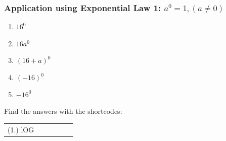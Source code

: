             \subsubsection{  Application using Exponential Law 1: ${a}^{0}=1,\left(a\ne 0\right)$ }
            \nopagebreak
        \label{m38359*id63666}\begin{enumerate}[noitemsep, label=\textbf{\arabic*}. ] 
            \label{m38359*uid6}\item 
            \begin{math}{16}^{0}\end{math}
      \label{m38359*uid7}\item 
        \begin{math}16{a}^{0}\end{math}
      \label{m38359*uid8}\item 
        \begin{math}{\left(16+a\right)}^{0}\end{math}
      \label{m38359*uid9}\item 
        \begin{math}{\left(-16\right)}^{0}\end{math}
      \label{m38359*uid10}\item 
        \begin{math}-{16}^{0}\end{math} 
\newline
\newline
          \end{enumerate}
      \label{m38359*uid11}
\par {} Find the answers with the shortcodes:
 \par \begin{tabular}[h]{cccccc}
 (1.) lOG  & \end{tabular}
